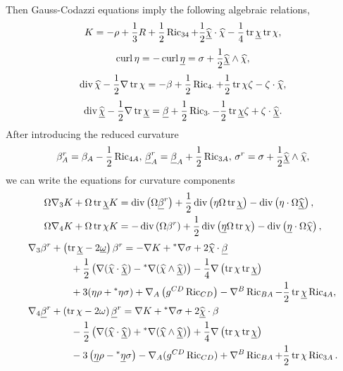 Then Gauss-Codazzi equations imply the following algebraic relations,
\begin{equation}
    K=-\rho+\frac{1}{3}R+\frac{1}{2}\operatorname{Ric}_{34}+\frac{1}{2}\widehat{\underline\chi}\cdot\widehat\chi-\frac{1}{4}\operatorname{tr}\underline\chi\operatorname{tr}\chi,
\end{equation}
\begin{equation}
    \operatorname{curl}\eta=-\operatorname{curl}\underline\eta=\sigma+\frac{1}{2}\widehat{\underline\chi}\wedge\widehat\chi,
\end{equation}
\begin{equation}\label{Codazzi_eq_chi}
    \operatorname{div}\widehat\chi-\frac{1}{2}\nabla\operatorname{tr}\chi=-\beta+\frac{1}{2}\operatorname{Ric}_{4\cdot}+\frac{1}{2}\operatorname{tr}\chi\zeta-\zeta\cdot\widehat\chi,
\end{equation}
\begin{equation}\label{Codazzi_eq_chib}
    \operatorname{div}\widehat{\underline\chi}-\frac{1}{2}\nabla\operatorname{tr}\underline\chi=\underline\beta+\frac{1}{2}\operatorname{Ric}_{3\cdot}-\frac{1}{2}\operatorname{tr}\underline\chi\zeta+\zeta\cdot\widehat{\underline\chi}.
\end{equation}
After introducing the reduced curvature
\begin{equation}
    \beta^r_A=\beta_A-\frac{1}{2}\operatorname{Ric}_{4A},\, \underline\beta^r_A=\underline\beta_A+\frac{1}{2}\operatorname{Ric}_{3A}, \,\sigma^r=\sigma+\frac{1}{2}\widehat{\underline\chi}\wedge\widehat\chi,
\end{equation}
we can write the equations for curvature components
\begin{equation}
    \begin{aligned}
        &\Omega\nabla_3 K+\Omega\operatorname{tr}\underline\chi K=\operatorname{div} \left(\Omega\underline\beta^r\right)+\frac{1}{2}\operatorname{div}\left(\eta\Omega\operatorname{tr}\underline\chi\right)-\operatorname{div}\left(\eta\cdot\Omega\widehat{\underline\chi}\right),\\
         &\Omega\nabla_4 K+\Omega\operatorname{tr}\chi K=-\operatorname{div} \left(\Omega\beta^r\right)+\frac{1}{2}\operatorname{div}\left(\underline\eta\Omega\operatorname{tr}\chi\right)-\operatorname{div}\left(\underline\eta\cdot\Omega\widehat\chi\right),
    \end{aligned}
\end{equation}
\begin{equation}
    \begin{aligned}
        \nabla_3\beta^r&+\left(\operatorname{tr}\underline\chi-2\underline\omega\right) \beta^r=-\nabla K+{}^*\nabla\sigma+2\widehat\chi\cdot\underline\beta\\
        &\qquad+\frac{1}{2}\left(\nabla(\widehat\chi\cdot\widehat{\underline\chi})-{}^*\nabla(\widehat\chi\wedge\widehat{\underline\chi})\right)-\frac{1}{4}\nabla\left(\operatorname{tr}\chi\operatorname{tr}\underline\chi\right)\\
        &\qquad+3(\eta\rho+{}^*\eta\sigma)+\nabla_A\left(g^{CD}\operatorname{Ric}_{CD}\right)-\nabla^B \operatorname{Ric}_{BA}-\frac{1}{2}\operatorname{tr}\underline\chi \operatorname{Ric}_{4A},\\
        \nabla_4\underline\beta^r&+\left(\operatorname{tr}\chi -2\omega\right)\underline\beta^r=\nabla K+{}^*\nabla\sigma+2\widehat{\underline\chi}\cdot\beta\\
        &\qquad-\frac{1}{2}\left(\nabla(\widehat\chi\cdot\widehat{\underline\chi})+{}^*\nabla(\widehat\chi\wedge\widehat{\underline\chi})\right)+\frac{1}{4}\nabla\left(\operatorname{tr}\chi\operatorname{tr}\underline\chi\right)\\
        &\qquad-3\left(\underline\eta\rho-{}^*\underline\eta\sigma\right) -\nabla_A(g^{CD}\operatorname{Ric}_{CD})+\nabla^B \operatorname{Ric}_{BA}+\frac{1}{2}\operatorname{tr}\chi \operatorname{Ric}_{3A}.
    \end{aligned}
\end{equation}
